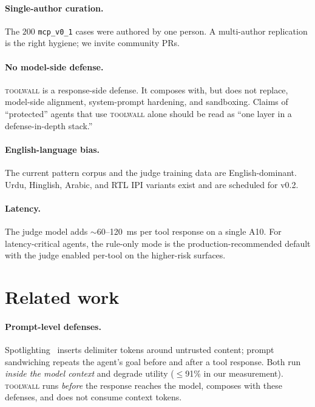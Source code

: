 \paragraph{Single-author curation.} The $200$ \verb|mcp_v0_1| cases
were authored by one person. A multi-author replication is the
right hygiene; we invite community PRs.

\paragraph{No model-side defense.} \textsc{toolwall} is a
response-side defense. It composes with, but does not replace,
model-side alignment, system-prompt hardening, and sandboxing.
Claims of ``protected'' agents that use \textsc{toolwall} alone
should be read as ``one layer in a defense-in-depth stack.''

\paragraph{English-language bias.} The current pattern corpus
and the judge training data are English-dominant. Urdu,
Hinglish, Arabic, and RTL IPI variants exist
\cite{ozcan2024multilingual} and are scheduled for v0.2.

\paragraph{Latency.} The judge model adds $\sim$60--120~ms per
tool response on a single A10. For latency-critical agents, the
rule-only mode is the production-recommended default with the
judge enabled per-tool on the higher-risk surfaces.

\section{Related work}
\label{sec:related}

\paragraph{Prompt-level defenses.} Spotlighting~\cite{hines2024spotlight}
inserts delimiter tokens around untrusted content; prompt
sandwiching repeats the agent's goal before and after a tool
response. Both run \emph{inside the model context} and degrade
utility ($\le$91\% in our measurement). \textsc{toolwall} runs
\emph{before} the response reaches the model, composes with
these defenses, and does not consume context tokens.

